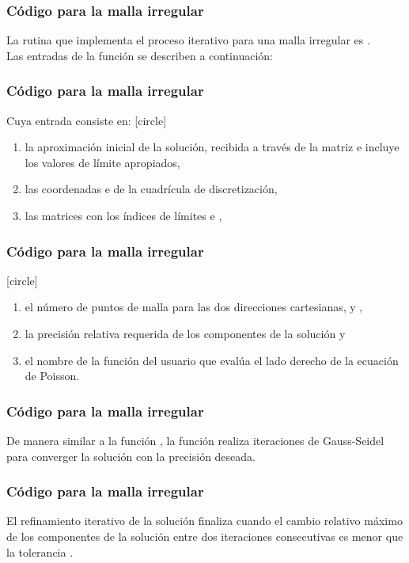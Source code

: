 \begin{frame}
\frametitle{Código para la malla irregular}
La rutina que implementa el proceso iterativo para una malla irregular es .
\\
\bigskip
Las entradas de la función se describen a continuación:
\end{frame}
\begin{frame}
\frametitle{Código para la malla irregular}
Cuya entrada consiste en:
[circle]
\begin{enumerate}[<+->]
\item la aproximación inicial de la solución, recibida a través de la matriz  e incluye los valores de límite apropiados,
\item las coordenadas  e  de la cuadrícula de discretización,
\item las matrices con los índices de límites  e ,
\seti
\end{enumerate}
\end{frame}
\begin{frame}
\frametitle{Código para la malla irregular}
[circle]
\begin{enumerate}[<+->]
\conti
\item el número de puntos de malla para las dos direcciones cartesianas,  y ,
\item la precisión relativa requerida de los componentes de la solución  y
\item el nombre de la función del usuario que evalúa el lado derecho de la ecuación de Poisson. 
\end{enumerate}
\end{frame}
\begin{frame}
\frametitle{Código para la malla irregular}
De manera similar a la función , la función  realiza iteraciones de Gauss-Seidel para converger la solución  con la precisión deseada.
\end{frame}
\begin{frame}
\frametitle{Código para la malla irregular}
El refinamiento iterativo de la solución finaliza cuando el cambio relativo máximo de los componentes de la solución entre dos iteraciones consecutivas es menor que la tolerancia .
\end{frame}
